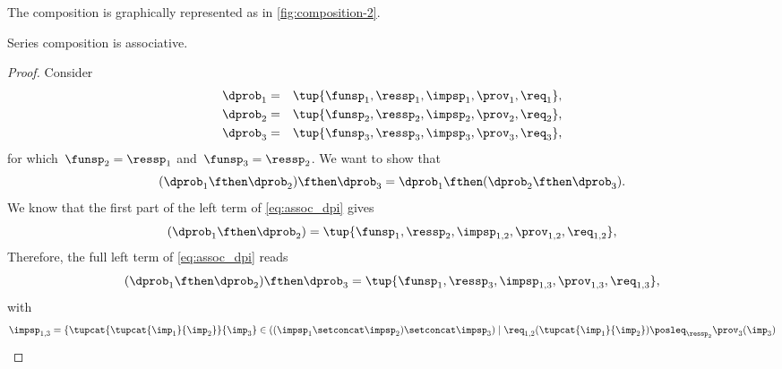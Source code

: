 The composition is graphically represented as in \cref{fig:composition-2}.

\begin{marginfigure}
    \label{fig:composition-2}
    \begin{center}
    \end{center}
\end{marginfigure}


\begin{lemma}
    Series composition is associative.
\end{lemma}
\begin{proof}
    Consider
    \begin{equation}
        \begin{aligned}
            \dprob_{1}&=&\tup{\funsp_{1},\ressp_{1},\impsp_{1},\prov_{1},\req_{1}},\\
            \dprob_{2}&=&\tup{\funsp_{2},\ressp_{2},\impsp_{2},\prov_{2},\req_{2}},\\
            \dprob_{3}&=&\tup{\funsp_{3},\ressp_{3},\impsp_{3},\prov_{3},\req_{3}},
        \end{aligned}
    \end{equation}
    for which~$\funsp_{2}=\ressp_{1}$ and~$\funsp_{3}=\ressp_{2}$. We want to show that
    \begin{equation}
        \label{eq:assoc_dpi}
        (\dprob_1\fthen \dprob_2)\fthen \dprob_3=\dprob_1\fthen (\dprob_2\fthen \dprob_3).
    \end{equation}
    We know that the first part of the left term of \cref{eq:assoc_dpi} gives
    \begin{equation}
    (\dprob_{1} \fthen \dprob_{2})
        =
        \tup{ \funsp_{1},\ressp_{2},\impsp_{1,2},\prov_{1,2},\req_{1,2}},
    \end{equation}
    Therefore, the full left term of \cref{eq:assoc_dpi} reads
    \begin{equation}
        \label{eq:dpi_ass_1}
        (\dprob_{1} \fthen \dprob_{2})\fthen \dprob_{3}=\tup{ \funsp_{1},\ressp_{3},\impsp_{1,3},\prov_{1,3},\req_{1,3}},
    \end{equation}
    with
    \begin{equation}
        \begin{aligned}
            \impsp_{1,3}  &=  \{  \tupcat {\tupcat {\imp_{1}} {\imp_{2}}} {\imp_{3}} \in ((\impsp_{1} \setconcat \impsp_{2})\setconcat \impsp_{3})\mid\req_{1,2}(\tupcat {\imp_{1}} {\imp_{2}})\posleq_{\ressp_{2}}\prov_{3}(\imp_{3})
            \\

\end{aligned}
\end{equation}
\end{proof}
